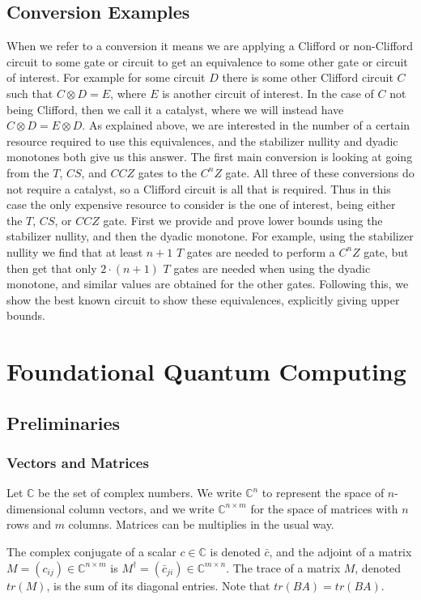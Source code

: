 \documentclass[12pt]{dalthesis}
\begin{document}
\section{Conversion Examples}
When we refer to a conversion it means we are applying a Clifford or non-Clifford circuit to some gate or circuit to get an equivalence to some other gate or circuit of interest. For example for some circuit $D$ there is some other Clifford circuit $C$ such that $C \otimes D = E$, where $E$ is another circuit of interest. In the case of $C$ not being Clifford, then we call it a catalyst, where we will instead have $C \otimes D = E \otimes D$. As explained above, we are interested in the number of a certain resource required to use this equivalences, and the stabilizer nullity and dyadic monotones both give us this answer. 
The first main conversion is looking at going from the $T$, $CS$, and $CCZ$ gates to the $C^nZ$ gate. All three of these conversions do not require a catalyst, so a Clifford circuit is all that is required. Thus in this case the only expensive resource to consider is the one of interest, being either the $T$, $CS$, or $CCZ$ gate. First we provide and prove lower bounds using the stabilizer nullity, and then the dyadic monotone. For example, using the stabilizer nullity we find that at least $n+1$ $T$ gates are needed to perform a $C^nZ$ gate, but then get that only $2\cdot (n+1)$ $T$ gates are needed when using the dyadic monotone, and similar values are obtained for the other gates. Following this, we show the best known circuit to show these equivalences, explicitly giving upper bounds.

\chapter{Foundational Quantum Computing}
\label{foundations}
\section{Preliminaries}
\subsection{Vectors and Matrices}
Let $\mathbb{C}$ be the set of complex numbers. We write $\mathbb{C}^n$ to represent the space of $n$-dimensional column vectors, and we write $\mathbb{C}^{n \times m}$ for the space of matrices with $n$ rows and $m$ columns. Matrices can be multiplies in the usual way. 

The complex conjugate of a scalar $c \in \mathbb{C}$ is denoted $\bar{c}$, and the adjoint of a matrix $M = (c_{ij}) \in \mathbb{C}^{n \times m}$ is $M^\dag = (\bar{c}_{ji}) \in \mathbb{C}^{m \times n}$. The trace of a matrix $M$, denoted $tr(M)$, is the sum of its diagonal entries. Note that $tr(BA) = tr(BA)$. 
\end{document}
